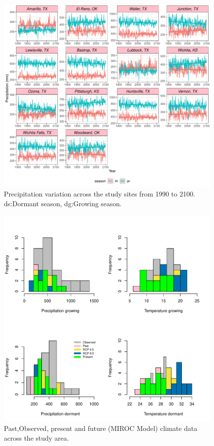 \documentclass[12pt]{article}
\begin{document}
\begin{figure}[H]
		\centering
		\includegraphics[width=0.95\linewidth]{Figures/fig_pr_past_present_future.pdf}
		\caption{Precipitation variation across the study sites from 1990 to 2100.
		ds:Dormant season, dg:Growing season.}
		\label{Sup:pr_variation}
\end{figure}

\begin{figure}[H]
		\centering
		\includegraphics[width=0.95\linewidth]{Figures/MIROC.pdf}
		\caption{Past,Observed, present and future (MIROC Model) climate data across the study area.}
		\label{Sup:projectionMIROC}
\end{figure}
\end{document}
